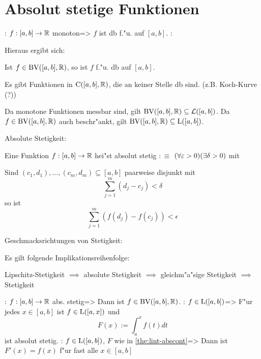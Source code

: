 \section{Absolut stetige Funktionen}
\theorem:
  $f:[a,b]\to\mathbb R$ monoton=>{
  $f$ ist db f."u. auf $[a,b]$.
  }
\remark:{
  Hieraus ergibt sich:
  \begin{stmts}
    \item Ist $f\in{\rm BV}([a,b],\mathbb R)$, so ist $f$ f."u. db auf $[a,b]$.
    \item Es gibt Funktionen in ${\rm C}([a,b],\mathbb R)$, die an keiner Stelle
      db sind. (z.B. Koch-Kurve (?))
    \item Da monotone Funktionen messbar sind, gilt 
      ${\rm BV}([a,b],\mathbb R)\subseteq\mathcal{L}([a,b])$. 
      Da $f\in{\rm BV}([a,b],\mathbb R)$ auch beschr"ankt, gilt
      ${\rm BV}([a,b],\mathbb R)\subseteq{\rm L}([a,b])$.
    \end{stmts}
  }
 Absolute Stetigkeit:{
  Eine Funktion $f:[a,b]\to\mathbb R$ hei"st absolut stetig $:\equiv$
  $(\forall \varepsilon>0) (\exists \delta>0)$ mit 
  
  Sind $(c_1,d_1),\ldots,(c_m,d_m)\subseteq[a,b]$ paarweise disjunkt mit
  \[\sum_{j=1}^m (d_j-c_j)<\delta
    \]
  so ist 
  \[\sum_{j=1}^m (f(d_j)-f(c_j))<\epsilon
    \]
  }
\remark Geschmacksrichtungen von Stetigkeit:{
  Es gilt folgende Implikationsreihenfolge:
  
  Lipschitz-Stetigkeit $\implies$ absolute Stetigkeit $\implies$ 
  gleichm"a"sige Stetigkeit $\implies$ Stetigkeit
  }
\theorem:
  $f:[a,b]\to\mathbb R$ abs. stetig=>{
  Dann ist $f\in{\rm BV}([a,b],\mathbb R)$.
  }
\theorem:
  $f\in{\rm L}([a,b])$=>{
  \label{the:lint-abscont}
  F"ur jedes $x\in[a,b]$ ist $f\in{\rm L}([a,x])$ und
  \[F(x):=\int_a^x f(t) dt
    \]
  ist absolut stetig.
  }
\theorem:
  $f\in{\rm L}([a,b])$, $F$ wie in \ref{the:lint-abscont}=>{
  Dann ist $F'(x)=f(x)$ f"ur fast alle $x\in[a,b]$
  }
